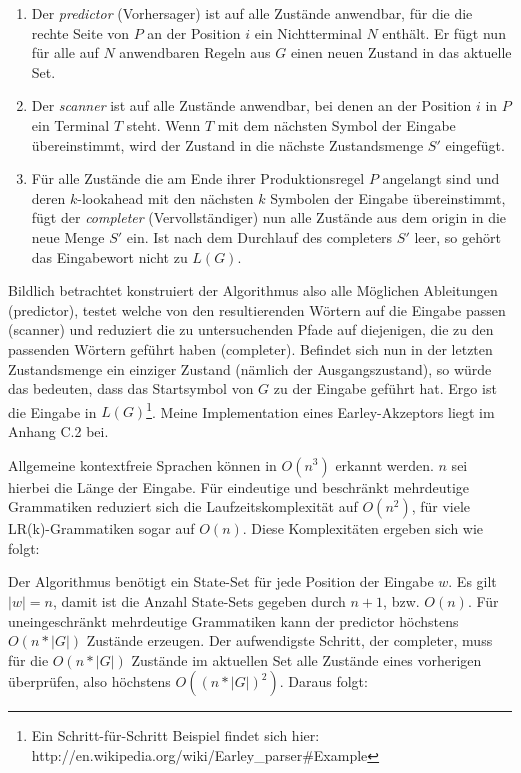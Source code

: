 \documentclass[12pt,a4paper]{article}
\theoremstyle{definition}
\begin{document}
			\begin{enumerate}
			\item{
				Der \textit{predictor} (Vorhersager) ist auf alle Zustände anwendbar, für die die rechte Seite von $P$ an der Position $i$ ein Nichtterminal $N$ enthält. Er fügt nun für alle auf $N$ anwendbaren Regeln aus $G$ einen neuen Zustand in das aktuelle Set.
			}
			\item{
				Der \textit{scanner} ist auf alle Zustände anwendbar, bei denen an der Position $i$ in $P$ ein Terminal $T$ steht. Wenn $T$ mit dem nächsten Symbol der Eingabe übereinstimmt, wird der Zustand in die nächste Zustandsmenge $S'$ eingefügt.
			}
			\item{
				Für alle Zustände die am Ende ihrer Produktionsregel $P$ angelangt sind und deren $k$-lookahead mit den nächsten $k$ Symbolen der Eingabe übereinstimmt, fügt der \textit{completer} (Vervollständiger) nun alle Zustände aus dem origin in die neue Menge $S'$ ein. Ist nach dem Durchlauf des completers $S'$ leer, so gehört das Eingabewort nicht zu $L(G)$.
			}
			\end{enumerate}
			
			Bildlich betrachtet konstruiert der Algorithmus also alle Möglichen Ableitungen (predictor), testet welche von den resultierenden Wörtern auf die Eingabe passen (scanner) und reduziert die zu untersuchenden Pfade auf diejenigen, die zu den passenden Wörtern geführt haben (completer). Befindet sich nun in der letzten Zustandsmenge ein einziger Zustand (nämlich der Ausgangszustand), so würde das bedeuten, dass das Startsymbol von $G$ zu der Eingabe geführt hat. Ergo ist die Eingabe in $L(G)$\footnote{Ein Schritt-für-Schritt Beispiel findet sich hier: http://en.wikipedia.org/wiki/Earley\_parser\#Example}. Meine Implementation eines Earley-Akzeptors liegt im Anhang C.2 bei.

			Allgemeine kontextfreie Sprachen können in $O(n^3)$ erkannt werden. $n$ sei hierbei die Länge der Eingabe. Für eindeutige und beschränkt mehrdeutige Grammatiken reduziert sich die Laufzeitskomplexität auf $O(n^2)$, für viele LR(k)-Grammatiken sogar auf $O(n)$. Diese Komplexitäten ergeben sich wie folgt:
			
			Der Algorithmus benötigt ein State-Set für jede Position der Eingabe $w$. Es gilt $|w|=n$, damit ist die Anzahl State-Sets gegeben durch $n+1$, bzw. $O(n)$. Für uneingeschränkt mehrdeutige Grammatiken kann der predictor höchstens $O(n*|G|)$ Zustände erzeugen. Der aufwendigste Schritt, der completer, muss für die $O(n*|G|)$ Zustände im aktuellen Set alle Zustände eines vorherigen überprüfen, also höchstens $O((n*|G|)^2)$. Daraus folgt:
				
\end{document}
